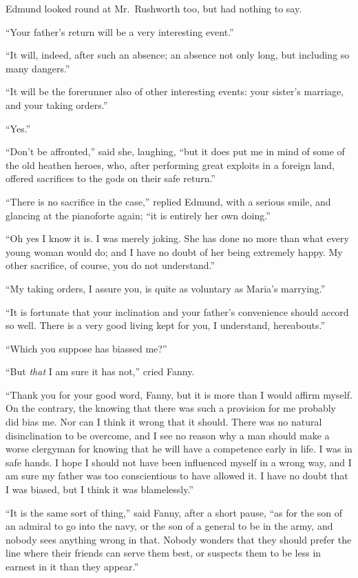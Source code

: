 \documentclass{article}
\begin{document}
Edmund looked round at Mr.\ Rushworth too, but had nothing
to say.

``Your father's return will be a very interesting event.''

``It will, indeed, after such an absence; an absence
not only long, but including so many dangers.''

``It will be the forerunner also of other interesting events:
your sister's marriage, and your taking orders.''

``Yes.''

``Don't be affronted,'' said she, laughing, ``but it does
put me in mind of some of the old heathen heroes, who,
after performing great exploits in a foreign land,
offered sacrifices to the gods on their safe return.''

``There is no sacrifice in the case,'' replied Edmund,
with a serious smile, and glancing at the pianoforte again;
``it is entirely her own doing.''

``Oh yes I know it is.  I was merely joking.  She has
done no more than what every young woman would do;
and I have no doubt of her being extremely happy.
My other sacrifice, of course, you do not understand.''

``My taking orders, I assure you, is quite as voluntary
as Maria's marrying.''

``It is fortunate that your inclination and your father's
convenience should accord so well.  There is a very good
living kept for you, I understand, hereabouts.''

``Which you suppose has biassed me?''

``But \emph{that} I am sure it has not,'' cried Fanny.

``Thank you for your good word, Fanny, but it is more than
I would affirm myself.  On the contrary, the knowing
that there was such a provision for me probably did
bias me.  Nor can I think it wrong that it should.
There was no natural disinclination to be overcome,
and I see no reason why a man should make a worse clergyman
for knowing that he will have a competence early in life.
I was in safe hands.  I hope I should not have been
influenced myself in a wrong way, and I am sure my father
was too conscientious to have allowed it.  I have no doubt
that I was biased, but I think it was blamelessly.''

``It is the same sort of thing,'' said Fanny, after a
short pause, ``as for the son of an admiral to go into
the navy, or the son of a general to be in the army,
and nobody sees anything wrong in that.  Nobody wonders
that they should prefer the line where their friends can
serve them best, or suspects them to be less in earnest
in it than they appear.''
\end{document}
